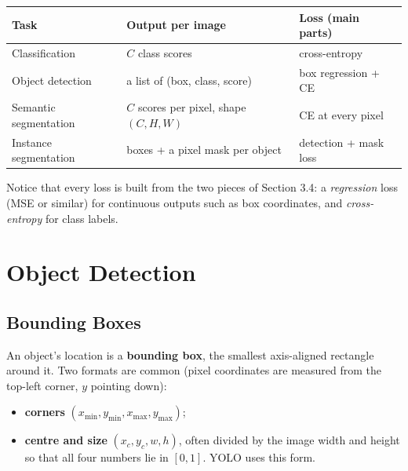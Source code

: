 \documentclass[12pt, a4paper]{article}
\begin{document}
\begin{center}
  \renewcommand{\arraystretch}{1.35}
  \begin{tabular}{lll}
    \toprule
    Task                   & Output per image                                & Loss (main parts)               \\
    \midrule
    Classification         & $C$ class scores                                & cross-entropy                   \\
    Object detection       & a list of (box, class, score)                   & box regression + CE\\
    Semantic segmentation  & $C$ scores per pixel, shape $(C, H, W)$ & CE at every pixel\\
    Instance segmentation  & boxes + a pixel mask per object           & detection + mask loss\\
    \bottomrule
  \end{tabular}
\end{center}

Notice that every loss is built from the two pieces of Section 3.4: a
\emph{regression} loss (MSE or similar) for continuous outputs such as box
coordinates, and \emph{cross-entropy} for class labels.

\section{Object Detection}

\subsection{Bounding Boxes}

An object's location is a \textbf{bounding box}, the smallest axis-aligned
rectangle around it. Two formats are common (pixel coordinates are measured
from the top-left corner, $y$ pointing down):
\begin{itemize}[nosep]
  \item \textbf{corners} $(x_{\min}, y_{\min}, x_{\max}, y_{\max})$;
  \item \textbf{centre and size} $(x_c, y_c, w, h)$, often divided by the
        image width and height so that all four numbers lie in $[0, 1]$.
        YOLO uses this form.
\end{itemize}
\end{document}
